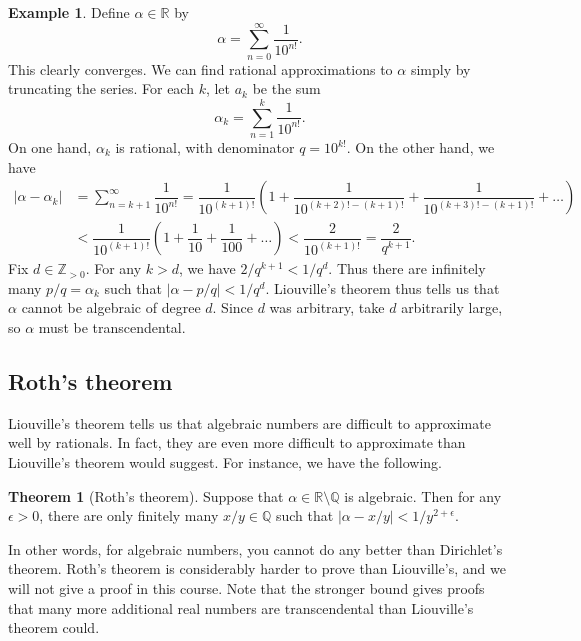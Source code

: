 \documentclass{article}
\newcommand{\Z}{\mathbb{Z}}
\newcommand{\Q}{\mathbb{Q}}
\newcommand{\R}{\mathbb{R}}
\newcommand{\rb}[1]{\left( #1 \right)}
\newcommand{\abs}[1]{\left\lvert #1 \right\rvert}
\theoremstyle{definition}\newtheorem{definition}{Definition}
\theoremstyle{definition}\newtheorem{remark}[definition]{Remark}
\theoremstyle{definition}\newtheorem*{example}{Example}
\theoremstyle{definition}\newtheorem*{note}{Note}
\newtheorem{theorem}[definition]{Theorem}
\begin{document}
\begin{example}
Define $ \alpha \in \R $ by
$$ \alpha = \sum_{n = 0}^\infty \dfrac{1}{10^{n!}}. $$
This clearly converges. We can find rational approximations to $ \alpha $ simply by truncating the series. For each $ k $, let $ a_k $ be the sum
$$ \alpha_k = \sum_{n = 1}^k \dfrac{1}{10^{n!}}. $$
On one hand, $ \alpha_k $ is rational, with denominator $ q = 10^{k!} $. On the other hand, we have
\begin{align*}
\abs{\alpha - \alpha_k}
& = \sum_{n = k + 1}^\infty \dfrac{1}{10^{n!}}
= \dfrac{1}{10^{\rb{k + 1}!}}\rb{1 + \dfrac{1}{10^{\rb{k + 2}! - \rb{k + 1}!}} + \dfrac{1}{10^{\rb{k + 3}! - \rb{k + 1}!}} + \dots} \\
& < \dfrac{1}{10^{\rb{k + 1}!}}\rb{1 + \dfrac{1}{10} + \dfrac{1}{100} + \dots}
< \dfrac{2}{10^{\rb{k + 1}!}}
= \dfrac{2}{q^{k + 1}}.
\end{align*}
Fix $ d \in \Z_{> 0} $. For any $ k > d $, we have $ 2 / q^{k + 1} < 1 / q^d $. Thus there are infinitely many $ p / q = \alpha_k $ such that $ \abs{\alpha - p / q} < 1 / q^d $. Liouville's theorem thus tells us that $ \alpha $ cannot be algebraic of degree $ d $. Since $ d $ was arbitrary, take $ d $ arbitrarily large, so $ \alpha $ must be transcendental.
\end{example}


\subsection{Roth's theorem}

Liouville's theorem tells us that algebraic numbers are difficult to approximate well by rationals. In fact, they are even more difficult to approximate than Liouville's theorem would suggest. For instance, we have the following.

\begin{theorem}[Roth's theorem]
Suppose that $ \alpha \in \R \setminus \Q $ is algebraic. Then for any $ \epsilon > 0 $, there are only finitely many $ x / y \in \Q $ such that $ \abs{\alpha - x / y} < 1 / y^{2 + \epsilon} $.
\end{theorem}

In other words, for algebraic numbers, you cannot do any better than Dirichlet's theorem. Roth's theorem is considerably harder to prove than Liouville's, and we will not give a proof in this course. Note that the stronger bound gives proofs that many more additional real numbers are transcendental than Liouville's theorem could.
\end{document}
